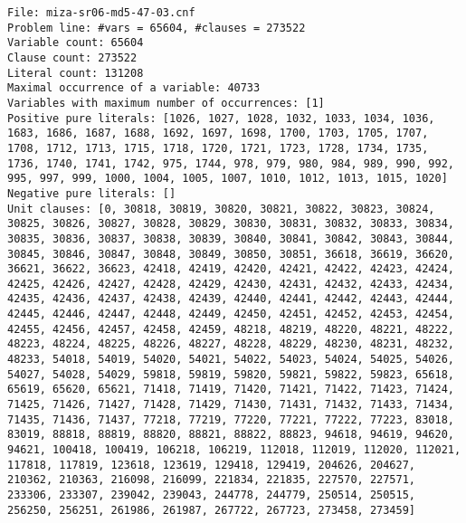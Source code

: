 \documentclass[a4paper,10pt]{article}
\begin{document}
\begin{lstlisting}
File: miza-sr06-md5-47-03.cnf
Problem line: #vars = 65604, #clauses = 273522
Variable count: 65604
Clause count: 273522
Literal count: 131208
Maximal occurrence of a variable: 40733
Variables with maximum number of occurrences: [1]
Positive pure literals: [1026, 1027, 1028, 1032, 1033, 1034, 1036, 1683, 1686, 1687, 1688, 1692, 1697, 1698, 1700, 1703, 1705, 1707, 1708, 1712, 1713, 1715, 1718, 1720, 1721, 1723, 1728, 1734, 1735, 1736, 1740, 1741, 1742, 975, 1744, 978, 979, 980, 984, 989, 990, 992, 995, 997, 999, 1000, 1004, 1005, 1007, 1010, 1012, 1013, 1015, 1020]
Negative pure literals: []
Unit clauses: [0, 30818, 30819, 30820, 30821, 30822, 30823, 30824, 30825, 30826, 30827, 30828, 30829, 30830, 30831, 30832, 30833, 30834, 30835, 30836, 30837, 30838, 30839, 30840, 30841, 30842, 30843, 30844, 30845, 30846, 30847, 30848, 30849, 30850, 30851, 36618, 36619, 36620, 36621, 36622, 36623, 42418, 42419, 42420, 42421, 42422, 42423, 42424, 42425, 42426, 42427, 42428, 42429, 42430, 42431, 42432, 42433, 42434, 42435, 42436, 42437, 42438, 42439, 42440, 42441, 42442, 42443, 42444, 42445, 42446, 42447, 42448, 42449, 42450, 42451, 42452, 42453, 42454, 42455, 42456, 42457, 42458, 42459, 48218, 48219, 48220, 48221, 48222, 48223, 48224, 48225, 48226, 48227, 48228, 48229, 48230, 48231, 48232, 48233, 54018, 54019, 54020, 54021, 54022, 54023, 54024, 54025, 54026, 54027, 54028, 54029, 59818, 59819, 59820, 59821, 59822, 59823, 65618, 65619, 65620, 65621, 71418, 71419, 71420, 71421, 71422, 71423, 71424, 71425, 71426, 71427, 71428, 71429, 71430, 71431, 71432, 71433, 71434, 71435, 71436, 71437, 77218, 77219, 77220, 77221, 77222, 77223, 83018, 83019, 88818, 88819, 88820, 88821, 88822, 88823, 94618, 94619, 94620, 94621, 100418, 100419, 106218, 106219, 112018, 112019, 112020, 112021, 117818, 117819, 123618, 123619, 129418, 129419, 204626, 204627, 210362, 210363, 216098, 216099, 221834, 221835, 227570, 227571, 233306, 233307, 239042, 239043, 244778, 244779, 250514, 250515, 256250, 256251, 261986, 261987, 267722, 267723, 273458, 273459]
\end{lstlisting}
\end{document}
